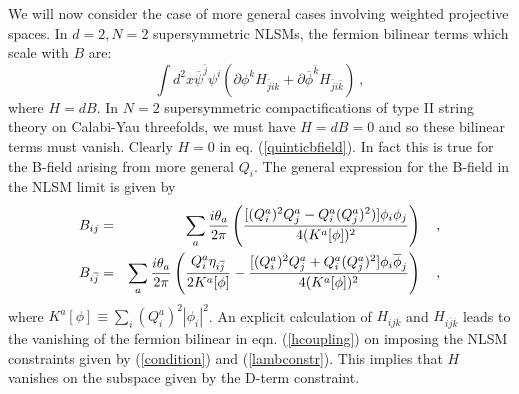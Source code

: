 \documentclass[a4paper,12pt]{article}
\begin{document}
We will now consider the case of more general cases involving weighted
projective spaces.
In $d=2,N=2$ supersymmetric NLSMs,
the fermion bilinear terms which scale with $B$
are\cite{zumino}:
\begin{equation}
	\int d^2 x \overline{\psi}^{\bar{j}}\psi^i
	\left(\partial \phi^k H_{\bar{j} i k} + 
	\partial \overline{\phi}^{\bar{k}}
		H_{\bar{j} i \bar{k}} \right)\ ,
\label{hcoupling}
\end{equation} 
where $H = dB$.
In $N=2$ supersymmetric compactifications of type
II string theory on Calabi-Yau threefolds, 
we must have $H = dB = 0$ and so these
bilinear terms must vanish.
Clearly $H=0$ in eq. (\ref{quinticbfield}).
In fact this is true for the B-field
arising from more general $Q_i$.
The general expression for the B-field in the NLSM limit is given by
\begin{eqnarray}
B_{ij} &=& \sum_a {{i\theta_a}\over{2\pi} }
\left({{[(Q^a_i)^2 Q^a_j - Q^a_i (Q^a_j)^2)] \phi_i \phi_j}\over{
4(K^a[\phi])^2 }} \right) \quad,\\
B_{i\overline{j}} &=& \sum_a {{i\theta_a}\over{2\pi} }
\left( {{Q^a_i \eta_{i\overline{j}}}\over { 2K^a[\phi] }} - 
{{[(Q^a_i)^2 Q^a_j + Q^a_i (Q^a_j)^2] \phi_i \overline{\phi}_j}\over
{4(K^a[\phi])^2 }} \right) \quad,
\end{eqnarray}
where $K^a[\phi]\equiv \sum_i (Q_i^a)^2 |\phi_i|^2$.
An explicit calculation of $H_{ij\overline{k}}$ and
$H_{i\overline{j}\overline{k}}$ leads to the vanishing of
the fermion bilinear in eqn. (\ref{hcoupling}) on imposing
the NLSM constraints given by (\ref{condition}) and (\ref{lambconstr}).
This implies that $H$ vanishes on the subspace given by the D-term
constraint.
\end{document}
